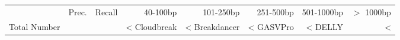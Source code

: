 \begin{table}[t]
\begin{center}
\begin{tabular}{rrr|rrrrr}
  \hline
 & Prec. & Recall & 40-100bp & 101-250bp & 251-500bp & 501-1000bp & $>$ 1000bp \\ 
Total Number & & & <%
  \hline
Cloudbreak & <%
Breakdancer & <%
  GASVPro & <%
  DELLY & <%

\end{tabular}
\end{center}
\end{table}
